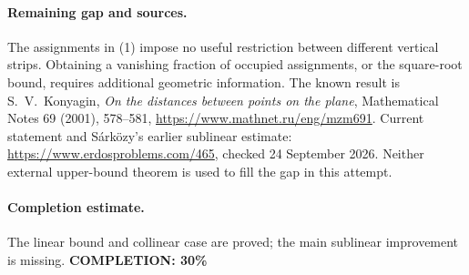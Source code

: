 \paragraph{Remaining gap and sources.}
The assignments in (1) impose no useful restriction between different
vertical strips. Obtaining a vanishing fraction of occupied assignments,
or the square-root bound, requires additional geometric information.
The known result is S.~V.~Konyagin,
\emph{On the distances between points on the plane},
Mathematical Notes 69 (2001), 578--581,
\url{https://www.mathnet.ru/eng/mzm691}.
Current statement and S\'ark\"ozy's earlier sublinear estimate:
\url{https://www.erdosproblems.com/465}, checked 24 September 2026.
Neither external upper-bound theorem is used to fill the gap in this attempt.

\paragraph{Completion estimate.}
The linear bound and collinear case are proved; the main sublinear improvement is missing.
\textbf{COMPLETION: 30\%}

